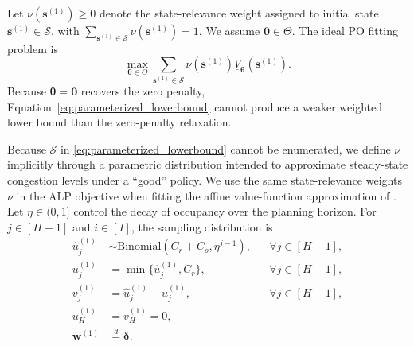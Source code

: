 \documentclass[11pt]{article}
\theoremstyle{definition}
\begin{document}
Let \(\nu(\boldsymbol{s}^{(1)})\ge0\) denote the state-relevance weight assigned to initial state \(\boldsymbol{s}^{(1)}\in\mathcal S\), with \(\sum_{\boldsymbol{s}^{(1)}\in\mathcal S}\nu(\boldsymbol{s}^{(1)})=1\). We assume \(\boldsymbol{0}\in\Theta\). The ideal PO fitting problem is
\begin{equation}
\label{eq:parameterized_lowerbound}
\max_{\boldsymbol{\theta}\in\Theta} \sum_{\boldsymbol{s}^{(1)}\in\mathcal S} \nu(\boldsymbol{s}^{(1)}) \underline V_{\boldsymbol{\theta}}(\boldsymbol{s}^{(1)}).
\end{equation}
Because \(\boldsymbol{\theta}=\boldsymbol{0}\) recovers the zero penalty, Equation~\eqref{eq:parameterized_lowerbound} cannot produce a weaker weighted lower bound than the zero-penalty relaxation.

Because \(\mathcal S\) in \eqref{eq:parameterized_lowerbound} cannot be enumerated, we define \(\nu\) implicitly through a parametric distribution intended to approximate steady-state congestion levels under a ``good'' policy. We use the same state-relevance weights \(\nu\) in the ALP objective when fitting the affine value-function approximation of \citet{Saure2012ejor}. Let \(\eta\in(0,1]\) control the decay of occupancy over the planning horizon. For \(j\in[H-1]\) and \(i\in[I]\), the sampling distribution is
\begin{subequations}
\label{eq:representative_state_distribution}
\begin{align}
\hat u_j^{(1)} &\sim\mathrm{Binomial}(C_r+C_o,\eta^{j-1}), &&\forall j\in[H-1], \label{eq:representative_total_occupancy}\\
u_j^{(1)} &=\min\{\hat u_j^{(1)},C_r\}, &&\forall j\in[H-1], \label{eq:representative_regular_occupancy}\\
v_j^{(1)} &=\hat u_j^{(1)}-u_j^{(1)}, &&\forall j\in[H-1], \label{eq:representative_overtime_occupancy}\\
u_H^{(1)}&=v_H^{(1)}=0, \label{eq:representative_terminal_occupancy}\\
\boldsymbol w^{(1)} &\overset{d}{=}\boldsymbol\delta. \label{eq:representative_waitlist}
\end{align}
\end{subequations}
\end{document}
